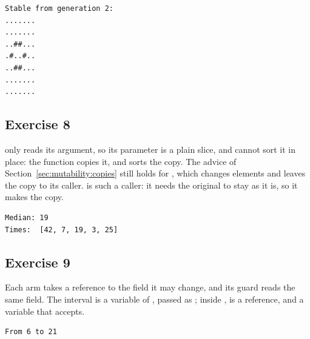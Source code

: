 
\vspace{-10pt}%
\begin{lstlisting}[style=bashVerb]
Stable from generation 2:
.......
.......
..##...
.#..#..
..##...
.......
.......
\end{lstlisting}

\subsection*{Exercise 8}

 only reads its argument, so its parameter is a plain slice, and
 cannot sort it in place: the function copies it, and sorts the
copy. The advice of Section~\ref{sec:mutability:copies} still holds for
, which changes elements and leaves the copy to its caller.
 is such a caller: it needs the original to stay as it is, so it
makes the copy.


\vspace{-10pt}%
\begin{lstlisting}[style=bashVerb]
Median: 19
Times:  [42, 7, 19, 3, 25]
\end{lstlisting}

\subsection*{Exercise 9}

Each arm takes a reference to the field it may change, and its guard reads the
same field. The interval is a variable of , passed as ; inside ,  is a reference, and a variable
that  accepts.


\vspace{-10pt}%
\begin{lstlisting}[style=bashVerb]
From 6 to 21
\end{lstlisting}
